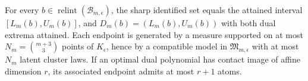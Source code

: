For every \(b\in\operatorname{relint}(\mathcal B_{m,\epsilon})\), the sharp identified set equals the attained interval \([L_m(b),U_m(b)]\), and \(D_m(b)=(L_m(b),U_m(b))\) with both dual extrema attained. Each endpoint is generated by a measure supported on at most \(N_m={m+3\choose3}\) points of \(K_{\epsilon}\), hence by a compatible model in \(\mathfrak M_{m,\epsilon}\) with at most \(N_m\) latent cluster laws. If an optimal dual polynomial has contact image of affine dimension \(r\), its associated endpoint admits at most \(r+1\) atoms.